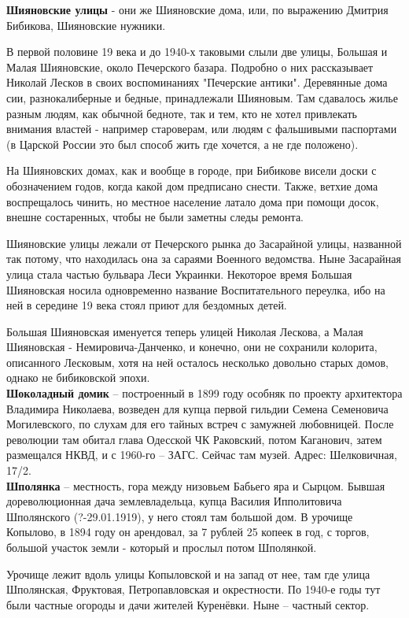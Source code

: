 \textbf{Шияновские улицы} - они же Шияновские дома, или, по выражению Дмитрия Бибикова, Шияновские нужники.

В первой половине 19 века и до 1940-х таковыми слыли две улицы, Большая и Малая Шияновские, около Печерского базара. Подробно о них рассказывает Николай Лесков в своих воспоминаниях "Печерские антики". Деревянные дома сии, разнокалиберные и бедные, принадлежали Шияновым. Там сдавалось жилье разным людям, как обычной бедноте, так и тем, кто не хотел привлекать внимания властей - например староверам, или людям с фальшивыми паспортами (в Царской России это был способ жить где хочется, а не где положено).

На Шияновских домах, как и вообще в городе, при Бибикове висели доски с обозначением годов, когда какой дом предписано снести. Также, ветхие дома воспрещалось чинить, но местное население латало дома при помощи досок, внешне состаренных, чтобы не были заметны следы ремонта.

Шияновские улицы лежали от Печерского рынка до Засарайной улицы, названной так потому, что находилась она за сараями Военного ведомства. Ныне Засарайная улица стала частью бульвара Леси Украинки. Некоторое время Большая Шияновская носила одновременно название Воспитательного переулка, ибо на ней в середине 19 века стоял приют для бездомных детей.

Большая Шияновская именуется теперь улицей Николая Лескова, а Малая Шияновская - Немировича-Данченко, и конечно, они не сохранили колорита, описанного Лесковым, хотя на ней осталось несколько довольно старых домов, однако не бибиковской эпохи.\\

\textbf{Шоколадный домик} – построенный в 1899 году особняк по проекту архитектора Владимира Николаева, возведен для купца первой гильдии Семена Семеновича Могилевского, по слухам для его тайных встреч с замужней любовницей. После революции там обитал глава Одесской ЧК Раковский, потом Каганович, затем размещался НКВД, и с 1960-го – ЗАГС. Сейчас там музей. Адрес: Шелковичная, 17/2.\\

\textbf{Шполянка} – местность, гора между низовьем Бабьего яра и Сырцом. Бывшая дореволюционная дача землевладельца, купца Василия Ипполитовича Шполянского (?-29.01.1919), у него стоял там большой дом. В урочище Копылово, в 1894 году он арендовал, за 7 рублей 25 копеек в год, с торгов, большой участок земли - который и прослыл потом Шполянкой.

Урочище лежит вдоль улицы Копыловской и на запад от нее, там где улица Шполянская, Фруктовая, Петропавловская и окрестности. По 1940-е годы тут были частные огороды и дачи жителей Куренёвки. Ныне – частный сектор.


